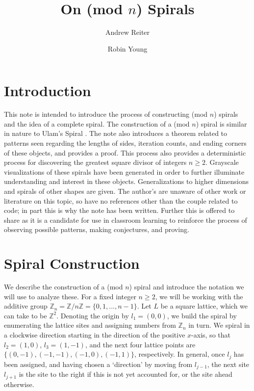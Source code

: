 \documentclass[11pt,reqno]{amsart}
\title{On (mod $n$) Spirals}
\author{Andrew Reiter}
\author{Robin Young}
\theoremstyle{mydef}
\def\ZZ{\mathbb{Z}}
\begin{document}
\maketitle
\section{Introduction}

This note is intended to introduce the process of constructing (mod $n$) spirals and the idea of a complete spiral.  The construction of a (mod $n$) spiral is similar in nature to Ulam's Spiral \cite{Ulam}. The note also introduces a theorem related to patterns seen regarding the lengths of sides, iteration counts, and ending corners of these objects, and provides a proof. This process also provides a deterministic process for discovering the greatest square divisor of integers $n \ge 2$. Grayscale visualizations of these spirals have been generated in order to  further illuminate understanding and interest in these objects. Generalizations to higher dimensions and spirals of other shapes are given. The author's are unaware of other work or literature on this topic, so have no references other than the couple related to code; in part this is why the note has been written. Further this is offered to share as it is a candidate for use in classroom learning to reinforce the process of observing possible patterns, making conjectures, and proving.



\section{Spiral Construction}

We describe the construction of a (mod $n$) spiral and introduce the
notation we will use to analyze these.  For a fixed integer $n \ge 2$,
we will be working with the additive group
$\ZZ_n=\mathbb{Z}/n\mathbb{Z} = \{ 0, 1, ..., n-1 \}$.  Let $L$
be a square lattice, which we can take to be $\ZZ^2$.  Denoting
the origin by $l_1 = (0,0)$, we build the spiral by enumerating the
lattice sites and assigning numbers from $\mathbb{Z}_n$ in turn.  We
spiral in a clockwise direction starting in the direction of the
positive $x$-axis, so that $l_2 = (1,0)$, $l_3 = (1,-1)$, and the next four
lattice points are $\{(0, -1),(-1, -1),(-1, 0),(-1, 1)\}$,
respectively.  In general, once $l_j$ has been assigned, and having
chosen a `direction' by moving from $l_{j-1}$, the next site $l_{j+1}$
is the site to the right if this is not yet accounted for, or the site
ahead otherwise.
\end{document}
